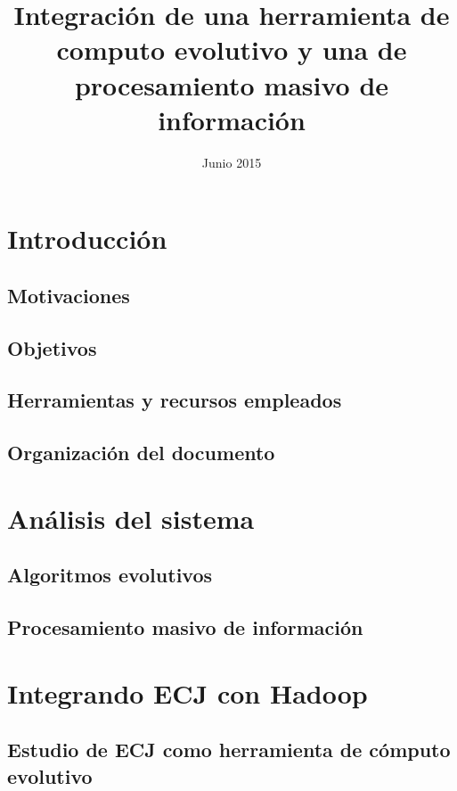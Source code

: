 \documentclass{estilos-y-libreria}
\title{Integración de una herramienta de computo evolutivo y una de procesamiento masivo de informaci\'on}
\date{Junio 2015}
\begin{document}
\frontmatter
\hacerportada
\hacercontraportada
\newpage{\ }
\thispagestyle{empty} 
\hacerprologo
\haceragradecimientos
\setcounter{secnumdepth}{2}
\setcounter{tocdepth}{2}
\tableofcontents
\listoffigures
\listoftables

\mainmatter

\chapter{Introducci\'on}\label{introduccion}
	\section{Motivaciones\label{motivaciones}}
		
	\section{Objetivos}
		
	\section{Herramientas y recursos empleados}
		
	\section{Organizaci\'on del documento}
			

\chapter{An\'alisis del sistema}\label{analisis}
	
	\section{Algoritmos evolutivos}
		
	\section{Procesamiento masivo de informaci\'on}
		

\chapter{Integrando ECJ con Hadoop}\label{integracion}
	
	\section{Estudio de ECJ como herramienta de c\'omputo evolutivo\label{desarrollo-ecj}}
		
\end{document}
